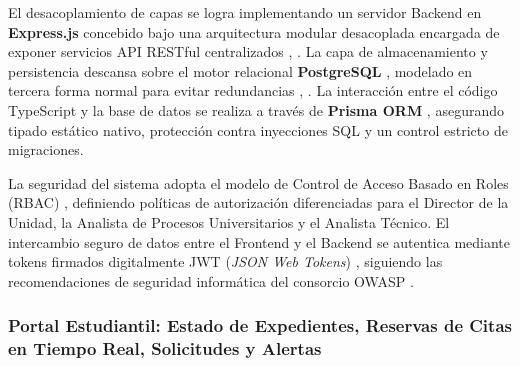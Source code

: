 El desacoplamiento de capas se logra implementando un servidor Backend en \textbf{Express.js} \cite{express_docs} concebido bajo una arquitectura modular desacoplada encargada de exponer servicios API RESTful centralizados \cite{fielding_rest}, \cite{newman_microservices}. La capa de almacenamiento y persistencia descansa sobre el motor relacional \textbf{PostgreSQL} \cite{postgresql_docs}, modelado en tercera forma normal para evitar redundancias \cite{elmasri}, \cite{silberschatz}. La interacción entre el código TypeScript y la base de datos se realiza a través de \textbf{Prisma ORM} \cite{prisma_docs}, asegurando tipado estático nativo, protección contra inyecciones SQL y un control estricto de migraciones.

La seguridad del sistema adopta el modelo de Control de Acceso Basado en Roles (RBAC) \cite{ferraiolo_rbac}, definiendo políticas de autorización diferenciadas para el Director de la Unidad, la Analista de Procesos Universitarios y el Analista Técnico. El intercambio seguro de datos entre el Frontend y el Backend se autentica mediante tokens firmados digitalmente JWT (\textit{JSON Web Tokens}) \cite{rfc_jwt}, siguiendo las recomendaciones de seguridad informática del consorcio OWASP \cite{owasp_top10}.

\subsubsection{Portal Estudiantil: Estado de Expedientes, Reservas de Citas en Tiempo Real, Solicitudes y Alertas}

